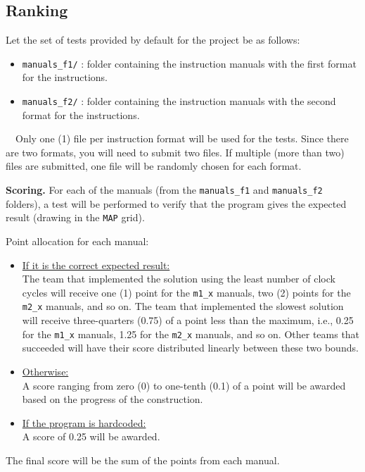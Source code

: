 \subsection*{Ranking}
\noindent
Let the set of tests provided by default for the project be as 
follows:
\begin{itemize}
  \item \texttt{manuals\_f1/} : folder containing the instruction 
    manuals with the first format for the instructions.
  \item \texttt{manuals\_f2/} : folder containing the instruction 
    manuals with the second format for the instructions.
\end{itemize}
\faExclamationCircle\ \ Only one (1) file per instruction format
will be used for the tests. Since there are two formats, you will need 
to submit two files. If multiple (more than two) files are submitted, 
one file will be randomly chosen for each format.
\medskip

\noindent
\textbf{Scoring. } \quad
For each of the manuals (from the \texttt{manuals\_f1} and 
\texttt{manuals\_f2} folders), a test will be performed to verify that 
the program gives the expected result (drawing in the \texttt{MAP} 
grid).

\noindent
Point allocation for each manual:
\begin{itemize} 
  \item \underline{If it is the correct expected result:} \\ 
    The team that implemented the solution using the least number of 
    clock cycles will receive one (1) point for the \texttt{m1\_x} 
    manuals, two (2) points for the \texttt{m2\_x} manuals, and so on. 
    The team that implemented the slowest solution will receive 
    three-quarters (0.75) of a point less than the maximum, i.e., 
    0.25 for the \texttt{m1\_x} manuals, 1.25 for the \texttt{m2\_x} 
    manuals, and so on. Other teams that succeeded will have their 
    score distributed linearly between these two bounds. 
  \item \underline{Otherwise:} \\ 
    A score ranging from zero (0) to one-tenth (0.1) of a point will 
    be awarded based on the progress of the construction. 
  \item \underline{If the program is hardcoded:} \\ A score of 0.25 
    will be awarded. 
\end{itemize}

\noindent
The final score will be the sum of the points from each manual.
